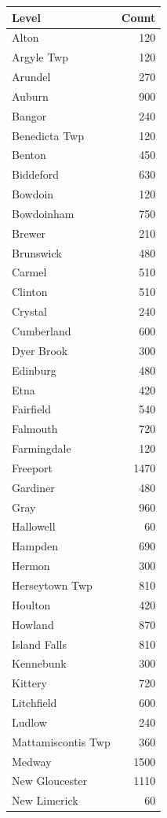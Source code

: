 \begin{table}[ht]
\centering
\begin{tabular}{lr}
  \hline
Level & Count \\ 
  \hline
Alton & 120 \\ 
  Argyle Twp & 120 \\ 
  Arundel & 270 \\ 
  Auburn & 900 \\ 
  Bangor & 240 \\ 
  Benedicta Twp & 120 \\ 
  Benton & 450 \\ 
  Biddeford & 630 \\ 
  Bowdoin & 120 \\ 
  Bowdoinham & 750 \\ 
  Brewer & 210 \\ 
  Brunswick & 480 \\ 
  Carmel & 510 \\ 
  Clinton & 510 \\ 
  Crystal & 240 \\ 
  Cumberland & 600 \\ 
  Dyer Brook & 300 \\ 
  Edinburg & 480 \\ 
  Etna & 420 \\ 
  Fairfield & 540 \\ 
  Falmouth & 720 \\ 
  Farmingdale & 120 \\ 
  Freeport & 1470 \\ 
  Gardiner & 480 \\ 
  Gray & 960 \\ 
  Hallowell &  60 \\ 
  Hampden & 690 \\ 
  Hermon & 300 \\ 
  Herseytown Twp & 810 \\ 
  Houlton & 420 \\ 
  Howland & 870 \\ 
  Island Falls & 810 \\ 
  Kennebunk & 300 \\ 
  Kittery & 720 \\ 
  Litchfield & 600 \\ 
  Ludlow & 240 \\ 
  Mattamiscontis Twp & 360 \\ 
  Medway & 1500 \\ 
  New Gloucester & 1110 \\ 
  New Limerick &  60 \\ 

\end{tabular}
\end{table}
